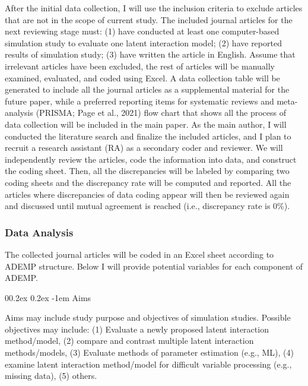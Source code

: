 \documentclass[
  man]{apa7}
\makeatletter
\let\oldparagraph\paragraph
\renewcommand{\paragraph}[1]{\oldparagraph{#1}\mbox{}}
\renewcommand{\paragraph}{\@startsection{paragraph}{4}{\parindent}%
  {0\baselineskip \@plus 0.2ex \@minus 0.2ex}%
  {-1em}%
  {\normalfont\normalsize\bfseries\itshape\typesectitle}}
\renewcommand{\paragraph}{\@startsection{paragraph}{4}{\parindent}%
  {0\baselineskip \@plus 0.2ex \@minus 0.2ex}%
  {-1em}%
  {\normalfont\normalsize\bfseries\typesectitle}}
\makeatother
\begin{document}
After the initial data collection, I will use the inclusion criteria to exclude articles that are not in the scope of current study. The included journal articles for the next reviewing stage must: (1) have conducted at least one computer-based simulation study to evaluate one latent interaction model; (2) have reported results of simulation study; (3) have written the article in English. Assume that irrelevant articles have been excluded, the rest of articles will be manually examined, evaluated, and coded using Excel. A data collection table will be generated to include all the journal articles as a supplemental material for the future paper, while a preferred reporting items for systematic reviews and meta-analysis (PRISMA; Page et al., 2021) flow chart that shows all the process of data collection will be included in the main paper. As the main author, I will conducted the literature search and finalize the included articles, and I plan to recruit a research assistant (RA) as a secondary coder and reviewer. We will independently review the articles, code the information into data, and construct the coding sheet. Then, all the discrepancies will be labeled by comparing two coding sheets and the discrepancy rate will be computed and reported. All the articles where discrepancies of data coding appear will then be reviewed again and discussed until mutual agreement is reached (i.e., discrepancy rate is 0\%).

\hypertarget{data-analysis}{%
\subsubsection{Data Analysis}\label{data-analysis}}

The collected journal articles will be coded in an Excel sheet according to ADEMP structure. Below I will provide potential variables for each component of ADEMP.

\hypertarget{aims}{%
\paragraph{Aims}\label{aims}}

Aims may include study purpose and objectives of simulation studies. Possible objectives may include: (1) Evaluate a newly proposed latent interaction method/model, (2) compare and contrast multiple latent interaction methods/models, (3) Evaluate methods of parameter estimation (e.g., ML), (4) examine latent interaction method/model for difficult variable processing (e.g., missing data), (5) others.
\end{document}
